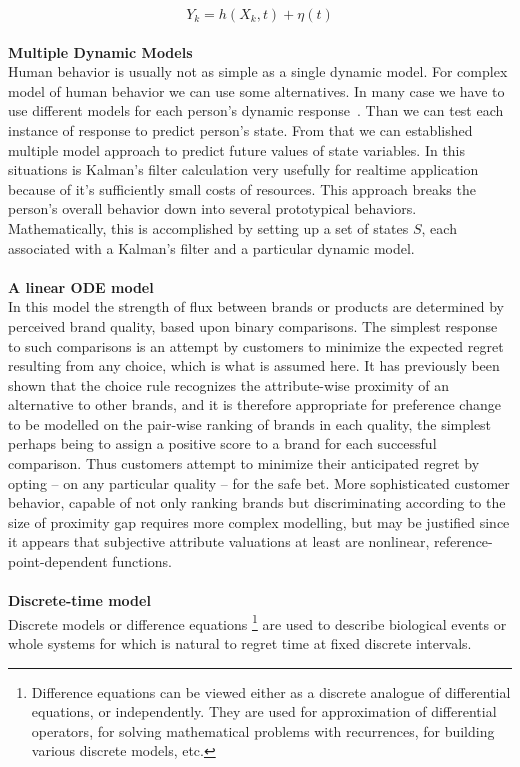 \begin{equation} \label{eq:2}
Y_k = h(X_k, t) + \eta(t)
\end{equation}
\\
\textbf{Multiple Dynamic Models} \label{subsec:multipleDynamicModels}\\
Human behavior is usually not as simple as a single dynamic model.
For complex model of human behavior we can use some alternatives.
In many case we have to use different models for each person's dynamic response~\cite{wilsky}.
Than we can test each instance of response to predict person's state.
From that we can established multiple model approach to predict future values of state variables.
In this situations is Kalman's filter calculation very usefully for realtime application because of it's sufficiently small costs of resources.
This approach breaks the person's overall behavior down into several prototypical behaviors.~\cite{pantland}
Mathematically, this is accomplished by setting up a set of states $S$, each associated with a Kalman's filter and a particular dynamic model.\\
\\
\textbf{A linear ODE model} \label{subsec:ode}\\
In this model the strength of flux between brands or products are determined by perceived brand quality,
based upon binary comparisons.
The simplest response to such comparisons is an attempt by customers to minimize the expected regret resulting
from any choice, which is what is assumed here.
It has previously been shown that the choice rule recognizes the attribute-wise proximity of an alternative
to other brands, and it is therefore appropriate for preference change to be modelled on the pair-wise ranking
of brands in each quality, the simplest perhaps being to assign a positive score to a brand for each successful comparison.
Thus customers attempt to minimize their anticipated regret by opting – on any particular quality – for the safe bet.
More sophisticated customer behavior, capable of not only ranking brands but discriminating according to the size of proximity gap
requires more complex modelling, but may be justified since it appears that subjective attribute valuations at least are nonlinear,
reference-point-dependent functions.\\
\\
\textbf{Discrete-time model} \label{subsec:discrete}\\
Discrete models or difference equations \footnote{Difference equations can be viewed either as a discrete analogue of differential equations, or independently.
They are used for approximation of differential operators, for solving mathematical problems with recurrences, for building various discrete
models, etc.} are used to describe biological events or whole systems for which is natural to regret time at fixed discrete intervals.

